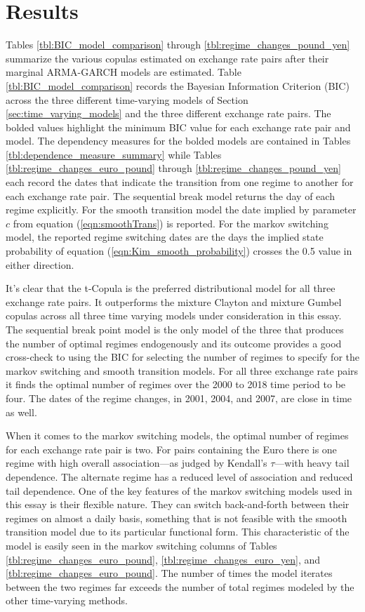 \documentclass[12pt]{article}
\begin{document}
\section{Results} \label{sec:Results}

Tables \ref{tbl:BIC_model_comparison} through \ref{tbl:regime_changes_pound_yen} summarize the various copulas estimated on exchange rate pairs after their marginal ARMA-GARCH models are estimated. Table \ref{tbl:BIC_model_comparison} records the Bayesian Information Criterion (BIC) across the three different time-varying models of Section \ref{sec:time_varying_models} and the three different exchange rate pairs. The bolded values highlight the minimum BIC value for each exchange rate pair and model. The dependency measures for the bolded models are contained in Tables \ref{tbl:dependence_measure_summary} while Tables \ref{tbl:regime_changes_euro_pound} through \ref{tbl:regime_changes_pound_yen} each record the dates that indicate the transition from one regime to another for each exchange rate pair. The sequential break model returns the day of each regime explicitly. For the smooth transition model the date implied by parameter $c$ from equation (\ref{eqn:smoothTrans}) is reported. For the markov switching model, the reported regime switching dates are the days the implied state probability of equation (\ref{eqn:Kim_smooth_probability}) crosses the 0.5 value in either direction.

It's clear that the t-Copula is the preferred distributional model for all three exchange rate pairs. It outperforms the mixture Clayton and mixture Gumbel copulas across all three time varying models under consideration in this essay. The sequential break point model is the only model of the three that produces the number of optimal regimes endogenously and its outcome provides a good cross-check to using the BIC for selecting the number of regimes to specify for the markov switching and smooth transition models. For all three exchange rate pairs it finds the optimal number of regimes over the 2000 to 2018 time period to be four. The dates of the regime changes, in 2001, 2004, and 2007, are close in time as well.

When it comes to the markov switching models, the optimal number of regimes for each exchange rate pair is two. For pairs containing the Euro there is one regime with high overall association---as judged by Kendall's $\tau$---with heavy tail dependence. The alternate regime has a reduced level of association and reduced tail dependence. One of the key features of the markov switching models used in this essay is their flexible nature. They can switch back-and-forth between their regimes on almost a daily basis, something that is not feasible with the smooth transition model due to its particular functional form. This characteristic of the model is easily seen in the markov switching columns of Tables \ref{tbl:regime_changes_euro_pound}, \ref{tbl:regime_changes_euro_yen}, and \ref{tbl:regime_changes_euro_pound}. The number of times the model iterates between the two regimes far exceeds the number of total regimes modeled by the other time-varying methods.
\end{document}
